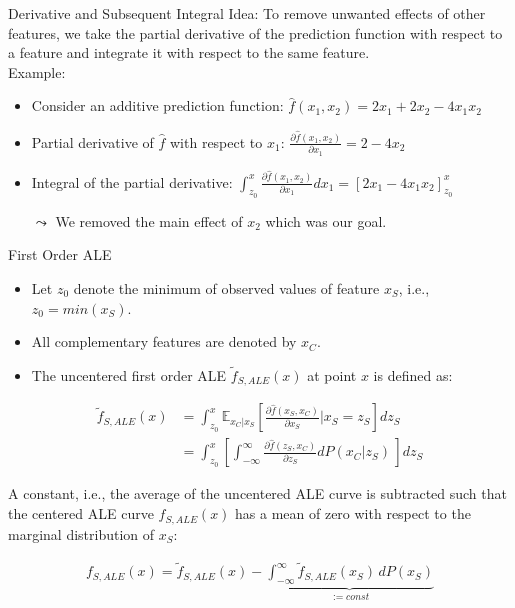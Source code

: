 \documentclass[aspectratio=169]{../latex_main/tntbeamer}  %
\begin{document}
\begin{frame}{Derivative and Subsequent Integral}
\alert{Idea:} To remove unwanted effects of other features, we take the partial derivative of the prediction function with respect to a feature and integrate it with respect to the same feature. \\
\smallskip\pause
Example:
\begin{itemize}
\item Consider an additive prediction function: $\hat{f}(x_1, x_2) = 2x_1 + 2x_2 - 4x_1 x_2$
\smallskip\pause
\item Partial derivative of $\hat{f}$ with respect to $x_1$: $\frac{\partial \hat{f}(x_1, x_2)}{\partial x_1} = 2 - 4x_2$
\smallskip\pause
\item Integral of the partial derivative:  $\int_{z_0}^{x} \frac{\partial \hat{f}(x_1, x_2)}{\partial x_1} dx_1 = \left[2x_1 - 4x_1 x_2\right]_{z_0}^{x}$
\smallskip\pause
\item[$\leadsto$] We removed the main effect of $x_2$ which was our goal.
\end{itemize}
\end{frame}


\begin{frame}{First Order ALE}

\vspace{-2em}
\begin{itemize}
    \item Let $z_0$ denote the minimum of observed values of feature $x_S$, i.e., $z_0 = min(x_S)$.
    \item All complementary features are denoted by $x_C$.
    \item The uncentered first order ALE $\tilde{f}_{S, ALE}(x)$ at point $x$ is defined as:
\end{itemize}
  
$$
\begin{aligned}
\tilde{f}_{S, ALE}(x) &= \int_{z_{0}}^{x} \mathbb{E}_{x_C \vert x_S} \left[\frac{\partial \hat{f}(x_S, x_C)}{\partial x_S} \bigg \vert x_S = z_S \right] dz_S \\
&= \int_{z_{0}}^{x} \left[ \int_{-\infty}^{\infty}  \frac{\partial \hat{f}(z_S, x_C)}{\partial z_S} d P(x_C | z_S) \,   \right] dz_S
\end{aligned}
$$

\pause

A constant, i.e., the average of the uncentered ALE curve is subtracted such that the centered ALE curve $\hat{f}_{S, ALE}(x)$ has a mean of zero with respect to the marginal distribution of $x_S$:

$$
\begin{aligned}
f_{S, ALE}(x) = \tilde{f}_{S, ALE}(x) - \underbrace{\int_{-\infty}^{\infty}\tilde{f}_{S, ALE}(x_S) \, d P(x_S)}_{:= const}
\end{aligned}
$$

\end{frame}
\end{document}
